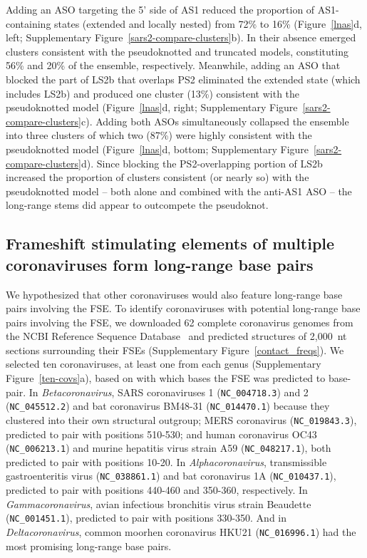 \documentclass[main.tex]{subfiles}
\begin{document}
Adding an ASO targeting the 5' side of AS1 reduced the proportion of AS1-containing states (extended and locally nested) from 72\% to 16\% (Figure~\ref{lnas}d, left; Supplementary Figure~\ref{sars2-compare-clusters}b).
In their absence emerged clusters consistent with the pseudoknotted and truncated models, constituting 56\% and 20\% of the ensemble, respectively.
Meanwhile, adding an ASO that blocked the part of LS2b that overlaps PS2 eliminated the extended state (which includes LS2b) and produced one cluster (13\%) consistent with the pseudoknotted model (Figure~\ref{lnas}d, right; Supplementary Figure~\ref{sars2-compare-clusters}c).
Adding both ASOs simultaneously collapsed the ensemble into three clusters of which two (87\%) were highly consistent with the pseudoknotted model (Figure~\ref{lnas}d, bottom; Supplementary Figure~\ref{sars2-compare-clusters}d).
Since blocking the PS2-overlapping portion of LS2b increased the proportion of clusters consistent (or nearly so) with the pseudoknotted model -- both alone and combined with the anti-AS1 ASO -- the long-range stems did appear to outcompete the pseudoknot.

\subsection{Frameshift stimulating elements of multiple coronaviruses form long-range base pairs}

We hypothesized that other coronaviruses would also feature long-range base pairs involving the FSE.
To identify coronaviruses with potential long-range base pairs involving the FSE, we downloaded 62 complete coronavirus genomes from the NCBI Reference Sequence Database~\cite{OLeary2016} and predicted structures of 2,000~nt sections surrounding their FSEs (Supplementary Figure~\ref{contact_freqs}).
We selected ten coronaviruses, at least one from each genus (Supplementary Figure~\ref{ten-covs}a), based on with which bases the FSE was predicted to base-pair.
In \textit{Betacoronavirus}, SARS coronaviruses 1 (\verb|NC_004718.3|) and 2 (\verb|NC_045512.2|) and bat coronavirus BM48-31 (\verb|NC_014470.1|) because they clustered into their own structural outgroup; MERS coronavirus (\verb|NC_019843.3|), predicted to pair with positions 510-530; and human coronavirus OC43 (\verb|NC_006213.1|) and murine hepatitis virus strain A59 (\verb|NC_048217.1|), both predicted to pair with positions 10-20.
In \textit{Alphacoronavirus}, transmissible gastroenteritis virus (\verb|NC_038861.1|) and bat coronavirus 1A (\verb|NC_010437.1|), predicted to pair with positions 440-460 and 350-360, respectively.
In \textit{Gammacoronavirus}, avian infectious bronchitis virus strain Beaudette (\verb|NC_001451.1|), predicted to pair with positions 330-350.
And in \textit{Deltacoronavirus}, common moorhen coronavirus HKU21 (\verb|NC_016996.1|) had the most promising long-range base pairs.
\end{document}
